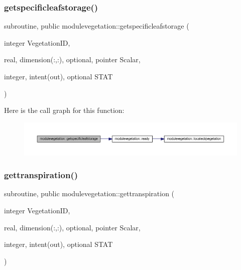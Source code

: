 \subsubsection{\texorpdfstring{getspecificleafstorage()}{getspecificleafstorage()}}
{\footnotesize\ttfamily subroutine, public modulevegetation\+::getspecificleafstorage (\begin{DoxyParamCaption}\item[{integer}]{Vegetation\+ID,  }\item[{real, dimension(\+:,\+:), optional, pointer}]{Scalar,  }\item[{integer, intent(out), optional}]{S\+T\+AT }\end{DoxyParamCaption})}

Here is the call graph for this function\+:\nopagebreak
\begin{figure}[H]
\begin{center}
\leavevmode
\includegraphics[width=350pt]{namespacemodulevegetation_aefe8dd6c224ba5b203b6c1be059d23e7_cgraph}
\end{center}
\end{figure}
\mbox{\label{namespacemodulevegetation_a016291d4e7aeb601c4e8ad878693cce7}} 
\subsubsection{\texorpdfstring{gettranspiration()}{gettranspiration()}}
{\footnotesize\ttfamily subroutine, public modulevegetation\+::gettranspiration (\begin{DoxyParamCaption}\item[{integer}]{Vegetation\+ID,  }\item[{real, dimension(\+:,\+:), optional, pointer}]{Scalar,  }\item[{integer, intent(out), optional}]{S\+T\+AT }\end{DoxyParamCaption})}

